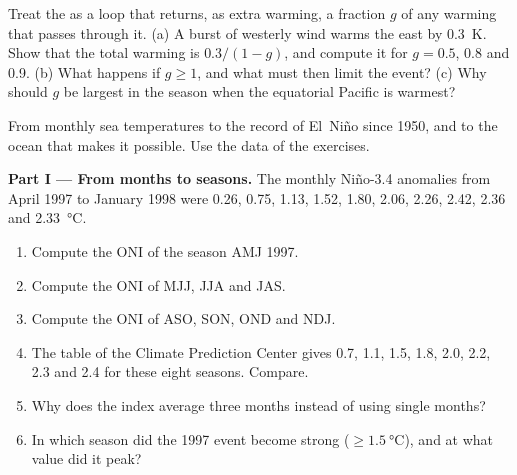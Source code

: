\begin{exercise}[$\star\star\star$]\label{exo:b2:climate-variability:12}
Treat the  as a loop that returns, as extra warming, a fraction $g$ of any
warming that passes through it. (a) A burst of westerly wind warms the east by \qty{0.3}{K}. Show
that the total warming is $0.3/(1 - g)$, and compute it for $g = 0.5$, 0.8 and 0.9. (b) What
happens if $g \geq 1$, and what must then limit the event? (c) Why should $g$ be largest in the
season when the equatorial Pacific is warmest?
\end{exercise}

\begin{problem}\label{pb:b2:climate-variability:1}
From monthly sea temperatures to the record of El~Niño since 1950, and to the ocean that makes it
possible. Use the data of the exercises.

\medskip\noindent\textbf{Part I --- From months to seasons.}
The monthly Niño-3.4 anomalies from April 1997 to January 1998 were 0.26, 0.75, 1.13, 1.52, 1.80,
2.06, 2.26, 2.42, 2.36 and \qty{2.33}{\celsius}.
\begin{enumerate}
  \item Compute the ONI of the season AMJ 1997.
  \item Compute the ONI of MJJ, JJA and JAS.
  \item Compute the ONI of ASO, SON, OND and NDJ.
  \item The table of the Climate Prediction Center gives 0.7, 1.1, 1.5, 1.8, 2.0, 2.2, 2.3 and
        2.4 for these eight seasons. Compare.
  \item Why does the index average three months instead of using single months?
  \item In which season did the 1997 event become strong ($\geq \qty{1.5}{\celsius}$), and at
        what value did it peak?
\end{enumerate}


\end{problem}
